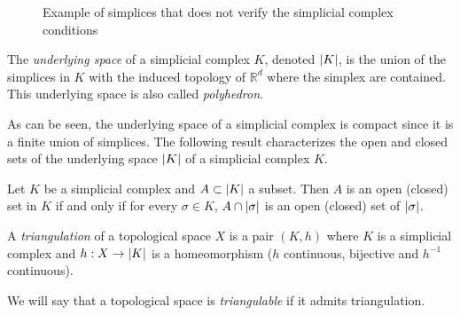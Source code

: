 \documentclass[../main.tex]{subfiles}
\begin{document}
\begin{figure}[ht]
\centering
{}
\caption{Example of simplices that does not verify the simplicial complex conditions}
\label{fig:noComp}
\end{figure}

\begin{definition}
The \emph{underlying space} of a simplicial complex $K$, denoted $\lvert K\rvert$, is the union of the simplices in $K$ with the induced topology of $\mathbb{R}^d$ where the simplex are contained. This underlying space is also called \emph{polyhedron}.
\end{definition}
As can be seen, the underlying space of a simplicial complex is compact since it is a finite union of simplices. The following result characterizes the open and closed sets of the underlying space $\lvert K\rvert$ of a simplicial complex $K$.

\begin{proposition}
Let $K$ be a simplicial complex and $A \subset \lvert K\rvert$ a subset. Then $A$ is an open (closed) set in $K$ if and only if for every $\sigma \in K$, $A \cap \lvert\sigma\rvert$ is an open (closed) set of $\lvert\sigma\rvert$.
\end{proposition}

\begin{definition}
A \emph{triangulation} of a topological space $X$ is a pair $(K, h)$ where $K$ is a simplicial complex and $h: X \to \lvert K\rvert$ is a homeomorphism ($h $ continuous, bijective and $h^{-1}$ continuous).
\end{definition}
We will say that a topological space is \emph{triangulable} if it admits triangulation.\\
\end{document}

